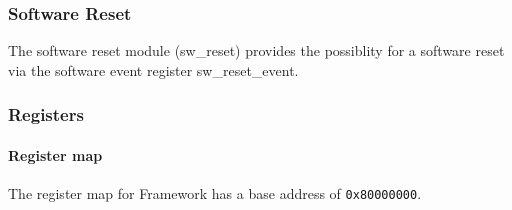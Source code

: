 \subsubsection{Software Reset} \label{sec:framework:software_reset}
The software reset module (sw\_reset) provides the possiblity for a software reset via the software event register sw\_reset\_event.

%

\subsubsection{Registers}
\label{sec:framework:registers}

\paragraph{Register map}
\label{sec:framework:reg_map}
The register map for Framework has a base address of \verb|0x80000000|.

